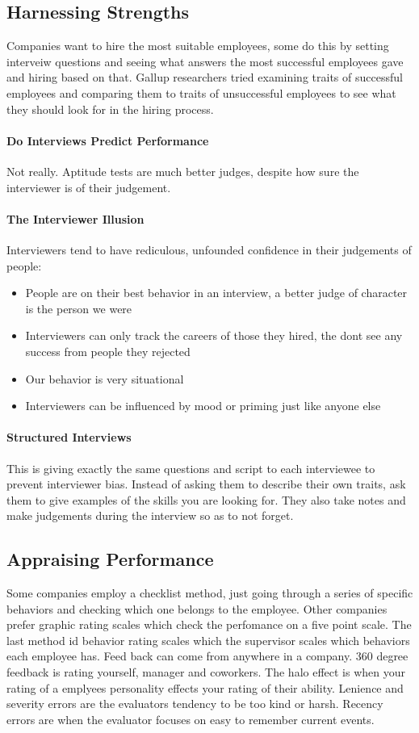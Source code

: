 \documentclass[12pt]{article}
\begin{document}
\subsection*{Harnessing Strengths}
Companies want to hire the most suitable employees, some do this by setting interveiw questions and seeing what answers the most successful employees gave and hiring based on that. Gallup researchers tried examining traits of successful employees and comparing them to traits of unsuccessful employees to see what they should look for in the hiring process.
\paragraph*{Do Interviews Predict Performance} Not really. Aptitude tests are much better judges, despite how sure the interviewer is of their judgement.
\paragraph*{The Interviewer Illusion} Interviewers tend to have rediculous, unfounded confidence in their judgements of people: 
\begin{itemize}
\item People are on their best behavior in an interview, a better judge of character is the person we were
\item Interviewers can only track the careers of those they hired, the dont see any success from people they rejected
\item Our behavior is very situational
\item Interviewers can be influenced by mood or priming just like anyone else
\end{itemize}	
\paragraph*{Structured Interviews} This is giving exactly the same questions and script to each interviewee to prevent interviewer bias. Instead of asking them to describe their own traits, ask them to give examples of the skills you are looking for. They also take notes and make judgements during the interview so as to not forget.
\subsection*{Appraising Performance}
Some companies employ a checklist method, just going through a series of specific behaviors and checking which one belongs to the employee. Other companies prefer graphic rating scales which check the perfomance on a five point scale. The last method id behavior rating scales which the supervisor scales which behaviors each employee has. Feed back can come from anywhere in a company. 360 degree feedback  is rating yourself, manager and coworkers. The halo effect is when your rating of a emplyees personality effects your rating of their ability. Lenience and severity errors are the evaluators tendency to be too kind or harsh. Recency errors are when the evaluator focuses on easy to remember current events.
\end{document}
